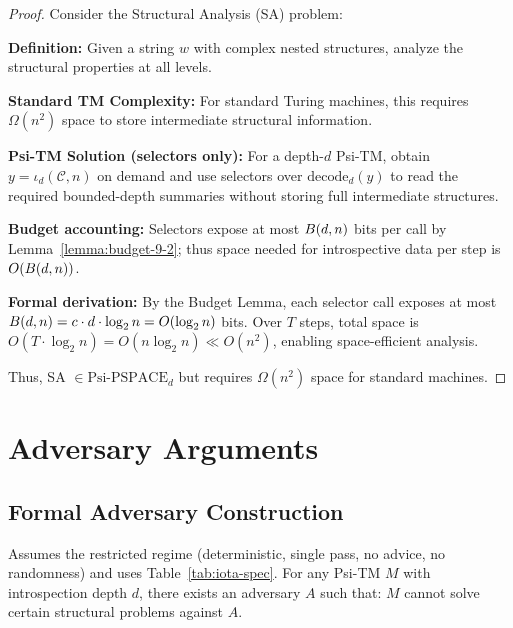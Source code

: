 \begin{proof}
Consider the Structural Analysis (SA) problem:

\textbf{Definition:} Given a string $w$ with complex nested structures, analyze the structural properties at all levels.

\textbf{Standard TM Complexity:}
For standard Turing machines, this requires $\Omega(n^2)$ space to store intermediate structural information.

\textbf{Psi-TM Solution (selectors only):}
For a depth-$d$ Psi-TM, obtain $y=\iota_d(\mathcal{C},n)$ on demand and use selectors over $\mathrm{decode}_d(y)$ to read the required bounded-depth summaries without storing full intermediate structures.

\textbf{Budget accounting:}
Selectors expose at most $\B(d,n)$ bits per call by Lemma~\ref{lemma:budget-9-2}; thus space needed for introspective data per step is $O(\B(d,n))$.

\textbf{Formal derivation:} By the Budget Lemma, each selector call exposes at most $\B(d,n) = c \cdot d \cdot \log_{2} n = O(\log_{2} n)$ bits. Over $T$ steps, total space is $O(T \cdot \log_{2} n) = O(n \log_{2} n) \ll O(n^2)$, enabling space-efficient analysis.

Thus, SA $\in \text{Psi-PSPACE}_d$ but requires $\Omega(n^2)$ space for standard machines.
\end{proof}

\section{Adversary Arguments}

\subsection{Formal Adversary Construction}

\begin{theorem}
Assumes the restricted regime (deterministic, single pass, no advice, no randomness) and uses Table~\ref{tab:iota-spec}.
For any Psi-TM $M$ with introspection depth $d$, there exists an adversary $A$ such that:
$M$ cannot solve certain structural problems against $A$.
\end{theorem}

